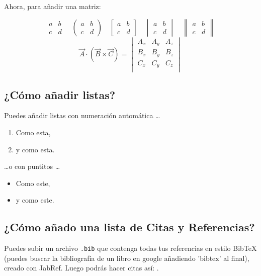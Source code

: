 \documentclass[a4paper]{article}
\begin{document}
Ahora, para añadir una matriz:

$$
\begin{matrix} 
a & b \\
c & d 
\end{matrix}
\quad
\begin{pmatrix} 
a & b \\
c & d 
\end{pmatrix}
\quad
\begin{bmatrix} 
a & b \\
c & d 
\end{bmatrix}
\quad
\begin{vmatrix} 
a & b \\
c & d 
\end{vmatrix}
\quad
\begin{Vmatrix} 
a & b \\
c & d 
\end{Vmatrix}
$$
\begin{equation}
\vec{A}\cdot(\vec{B}\times\vec{C})=\begin{vmatrix}
A_x&A_y&A_z\\
B_x&B_y&B_z\\
C_x&C_y&C_z\\
\end{vmatrix}
\end{equation}

\subsection{¿Cómo añadir listas?}

Puedes añadir listas con numeración automática \dots

\begin{enumerate}
\item Como esta,
\item y como esta.
\end{enumerate}
\dots o con puntitos \dots
\begin{itemize}
\item Como este,
\item y como este.
\end{itemize}

\subsection{¿Cómo añado una lista de Citas y Referencias?}

Puedes subir un archivo \verb|.bib| que contenga todas tus referencias en estilo BibTeX (puedes buscar la bibliografía de un libro en google añadiendo 'bibtex' al final), creado con JabRef. Luego podrás hacer citas así: \cite{Griffiths:1492149}.
\end{document}

